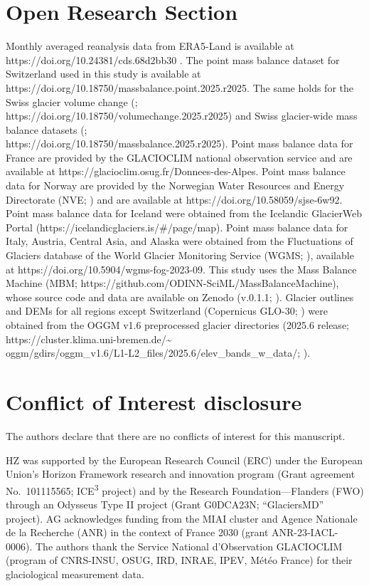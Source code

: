 \documentclass[draft]{agujournal2019}
\begin{document}
\section*{Open Research Section}
Monthly averaged reanalysis data from ERA5-Land \citep{ERA5Land, ERA5} is available at https://doi.org/10.24381/cds.68d2bb30 \citep{ERA5Land_CDS_2022}. The point mass balance dataset for Switzerland used in this study \citep{GLAMOS_point} is available at https://doi.org/10.18750/massbalance.point.2025.r2025. The same holds for the Swiss glacier volume change (\citealp{GLAMOS_vol}; \\ https://doi.org/10.18750/volumechange.2025.r2025) and Swiss glacier-wide mass balance datasets (\citealp{GLAMOS_glacier_wide}; \\https://doi.org/10.18750/massbalance.2025.r2025). Point mass balance data for France are provided by the GLACIOCLIM national observation service \citep{GLACIOCLIM_point} and are available at https://glacioclim.osug.fr/Donnees-des-Alpes. Point mass balance data for Norway are provided by the Norwegian Water Resources and Energy Directorate (NVE; \citealp{Elvehoy2025}) and are available at https://doi.org/10.58059/sjse-6w92. Point mass balance data for Iceland \citep{Bjornsson1998, Adalgeirsdottir2020} were obtained from the Icelandic GlacierWeb Portal (https://icelandicglaciers.is/\#/page/map). Point mass balance data for Italy, Austria, Central Asia, and Alaska were obtained from the Fluctuations of Glaciers database of the World Glacier Monitoring Service (WGMS; \citealp{WGMS2023}), available at https://doi.org/10.5904/wgms-fog-2023-09. This study uses the Mass Balance Machine (MBM; https://github.com/ODINN-SciML/MassBalanceMachine), whose source code and data are available on Zenodo (v.0.1.1; \citealp{MassBalanceMachine_2026}). Glacier outlines and DEMs for all regions except Switzerland (Copernicus GLO-30; \citealp{COPDEM}) were obtained from the OGGM v1.6 preprocessed glacier directories (2025.6 release; https://cluster.klima.uni-bremen.de/\textasciitilde \\oggm/gdirs/oggm\_v1.6/L1-L2\_files/2025.6/elev\_bands\_w\_data/; \citealp{Maussion_2019}).


\section*{Conflict of Interest disclosure}
The authors declare that there are no conflicts of interest for this manuscript.


\acknowledgments
HZ was supported by the European Research Council (ERC) under the European Union's Horizon Framework research and innovation program (Grant agreement No.~101115565; ICE\textsuperscript{3} project) and by the Research Foundation---Flanders (FWO) through an Odysseus Type II project (Grant G0DCA23N; ``GlaciersMD'' project). AG acknowledges funding from the MIAI cluster and Agence Nationale de la Recherche (ANR) in the context of France 2030 (grant ANR-23-IACL-0006). The authors thank the Service National d'Observation GLACIOCLIM (program of CNRS-INSU, OSUG, IRD, INRAE, IPEV, M\'et\'eo France) for their glaciological measurement data.



\clearpage 
 



\end{document}

